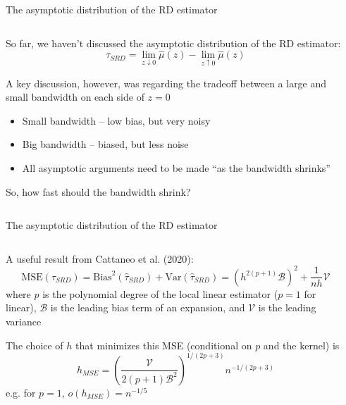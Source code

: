 \documentclass[notes,11pt, aspectratio=169]{beamer}
\newenvironment{wideitemize}{\itemize\addtolength{\itemsep}{10pt}}{\enditemize}
\begin{document}
\begin{frame}{The asymptotic distribution of the RD estimator}
    \begin{columns}[onlytextwidth, T] %
      \begin{column}{.9\textwidth}
        \begin{wideitemize}
        \item So far, we haven't discussed the asymptotic distribution of
          the RD estimator:
          $$\tau_{SRD} = \lim_{z \downarrow 0} \hat{\mu}(z) - \lim_{z
            \uparrow 0} \hat{\mu}(z)$$
        \item A key discussion, however, was regarding the tradeoff between a large and small bandwidth on each side of $z = 0$
          \begin{itemize}
          \item Small bandwidth -- low bias, but very noisy
          \item Big bandwidth -- biased, but less noise
          \item All asymptotic arguments need to be made ``as the bandwidth shrinks''
          \end{itemize}
        \item So, how fast should the bandwidth shrink?
        \end{wideitemize}
      \end{column}%
      \hfill%
      \begin{column}{.5\textwidth}
      \end{column}%
    \end{columns}
\end{frame}

\begin{frame}{The asymptotic distribution of the RD estimator}
    \begin{columns}[onlytextwidth, T] %
      \begin{column}{.9\textwidth}
        \begin{wideitemize}
        \item A useful result from Cattaneo et al. (2020):
          $$\text{MSE}(\hat{\tau}_{SRD}) = \text{Bias}^{2}(\hat{\tau}_{SRD}) + \text{Var}(\hat{\tau}_{SRD}) = (h^{2(p+1)}\mathcal{B})^{2} + \frac{1}{nh}\mathcal{V}$$
          where $p$ is the polynomial degree of the local linear
          estimator ($p=1$ for linear), $\mathcal{B}$ is the leading
          bias term of an expansion, and $\mathcal{V}$ is the leading
          variance
        \item The choice of $h$ that minimizes this MSE (conditional on $p$ and the kernel) is
          $$h_{MSE} = \left(\frac{\mathcal{V}}{2(p+1)\mathcal{B}^{2}}\right)^{1/(2p+3)}n^{-1/(2p+3)}$$
          e.g. for $p = 1$, $o(h_{MSE}) = n^{-1/5}$
      \end{wideitemize}
      \end{column}%
      \hfill%
      \begin{column}{.5\textwidth}
      \end{column}%
    \end{columns}
\end{frame}
\end{document}
